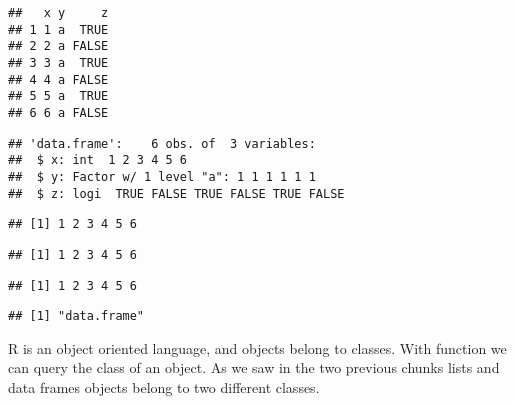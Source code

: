 \documentclass[paper=a4,10pt,div=17,headsepline,BCOR=12mm,twoside,open=right]{scrbook}\usepackage{knitr}
\begin{document}
\begin{knitrout}\footnotesize
{}\color{fgcolor}\begin{kframe}
\begin{alltt}
 \hlkwb{<-} \hlstd{(} \hlstd{=} \hlopt{:}\hlstd{,}  \hlstd{=} \hlstd{,}  \hlstd{=} \hlstd{(}\hlstd{,} \hlstd{))}
\end{alltt}
\begin{verbatim}
##   x y     z
## 1 1 a  TRUE
## 2 2 a FALSE
## 3 3 a  TRUE
## 4 4 a FALSE
## 5 5 a  TRUE
## 6 6 a FALSE
\end{verbatim}
\begin{alltt}
\end{alltt}
\begin{verbatim}
## 'data.frame':	6 obs. of  3 variables:
##  $ x: int  1 2 3 4 5 6
##  $ y: Factor w/ 1 level "a": 1 1 1 1 1 1
##  $ z: logi  TRUE FALSE TRUE FALSE TRUE FALSE
\end{verbatim}
\begin{alltt}
\hlopt{$}
\end{alltt}
\begin{verbatim}
## [1] 1 2 3 4 5 6
\end{verbatim}
\begin{alltt}
\hlstd{a.df[[}\hlstd{]]}
\end{alltt}
\begin{verbatim}
## [1] 1 2 3 4 5 6
\end{verbatim}
\begin{alltt}
\hlstd{a.df[[}\hlstd{]]}
\end{alltt}
\begin{verbatim}
## [1] 1 2 3 4 5 6
\end{verbatim}
\begin{alltt}
\end{alltt}
\begin{verbatim}
## [1] "data.frame"
\end{verbatim}
\end{kframe}
\end{knitrout}

R is an object oriented language, and objects belong to classes. With function  we can query the class of an object. As we saw in the two previous chunks lists and data frames objects belong to two different classes.
\end{document}
